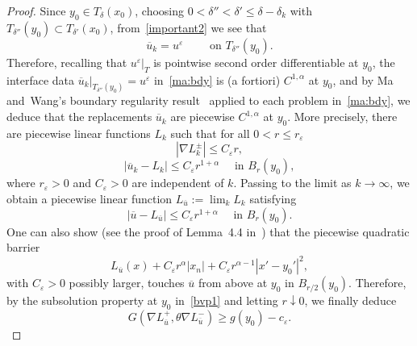 \documentclass[letter,11pt]{amsart}
\newcommand{\vep}{\varepsilon}
\theoremstyle{definition}
\numberwithin{equation}{section}
\begin{document}
\begin{proof}
Since $y_0 \in T_{\delta}(x_0)$, choosing $0 < \delta'' < \delta' \leq \delta - \delta_k$ with $T_{\delta''}(y_0) \subset T_{\delta'}(x_0)$, from~\eqref{important2} we see that
\[
\overline{u}_k = u^{\vep} \qquad \text{ on } T_{\delta''}(y_0).
\]
Therefore, recalling that $u^{\vep}|_{T}$ is pointwise second order differentiable at $y_0$, the interface data $\overline{u}_{k}|_{T_{\delta''}(y_0)} = u^{\vep}$ in~\eqref{ma:bdy} is (a fortiori) $C^{1,\alpha}$ at $y_0$, and by Ma and~Wang's boundary regularity result~\cite{MW} applied to each problem in~\eqref{ma:bdy}, we deduce that the replacements $\overline{u}_k$ are piecewise $C^{1,\alpha}$ at $y_{0}$.
More precisely, there are piecewise linear functions $L_k$ such that for all $0 < r \leq r_{\vep}$
\[
|\nabla L_k^{\pm}| \leq C_{\vep} r,
\]
\[
|\overline{u}_k - L_{k}| \leq C_{\vep} r^{1+\alpha} \quad \text{ in } B_r(y_0),
\]
where $r_{\vep} > 0$ and $C_{\vep} >0$ are  independent of $k$.
Passing to the limit as $k \to \infty$, we obtain a piecewise linear function $L_{\overline{u}} := \lim_{k} L_k$ satisfying
\begin{equation}
\label{lprop}
|\overline{u} - L_{\overline{u}}| \leq C_{\vep} r^{1+\alpha} \quad \text{ in } B_r(y_0).
\end{equation}
One can also show (see the proof of Lemma~4.4 in~\cite{DFS}) that the piecewise quadratic barrier
\[
L_{\overline{u}}(x) + C_{\vep} r^{\alpha} |x_n| + C_{\vep} r^{\alpha-1} |x'- y_{0}'|^2,
\]
with $C_{\vep} >0$ possibly larger, touches $\overline{u}$ from above at $y_{0}$ in $B_{r/2}(y_{0})$.
Therefore, by the subsolution property at $y_0$ in~\eqref{bvp1} and letting $r \downarrow 0$, we finally deduce
\begin{equation}
\label{eq:key2}
G(\nabla L_{\overline{u}}^{+}, \theta \nabla L_{\overline{u}}^{-}) \geq g(y_0) - c_{\vep}.
\end{equation}

\medskip
 

\end{proof}
\end{document}
